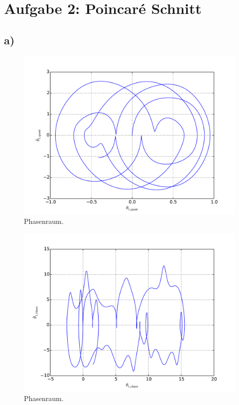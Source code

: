 \section*{Aufgabe 2: Poincaré Schnitt}
\subsection*{a)}
\begin{figure}[h!]
	\includegraphics[width = \textwidth]{../Plots/Plot_2_A_1_Phasenraum.pdf}
	\caption{Phasenraum.\label{fig:phasenraum1}}
\end{figure}

\begin{figure}[h!]
	\includegraphics[width = \textwidth]{../Plots/Plot_2_A_2_Phasenraum.pdf}
	\caption{Phasenraum.\label{fig:phasenraum2}}
\end{figure}

